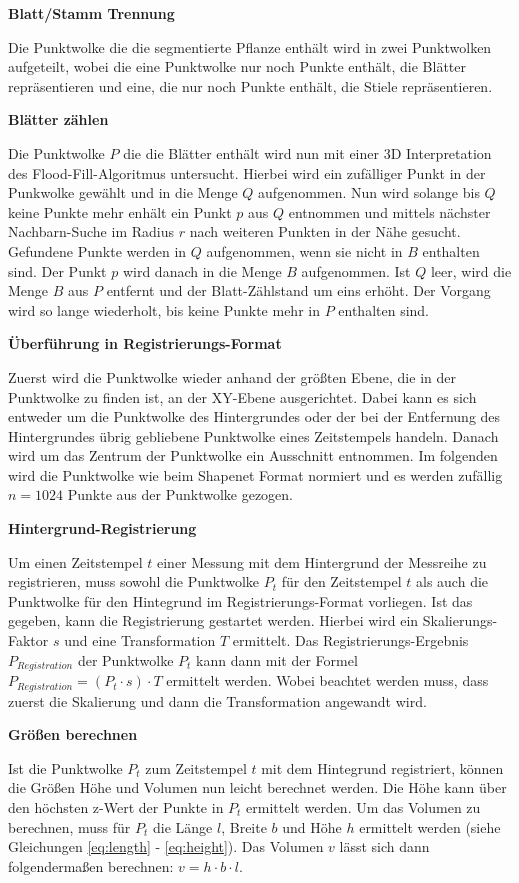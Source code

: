 \documentclass[12pt,titlepage, twoside]{article}
\begin{document}
\textbf{Blatt/Stamm Trennung}

Die Punktwolke die die segmentierte Pflanze enthält wird in zwei Punktwolken aufgeteilt, 
wobei die eine Punktwolke nur noch Punkte enthält, die Blätter repräsentieren und eine, die nur noch Punkte enthält, die Stiele repräsentieren.

\textbf{Blätter zählen}

Die Punktwolke $P$ die die Blätter enthält wird nun mit einer 3D Interpretation des Flood-Fill-Algoritmus untersucht. Hierbei wird ein zufälliger Punkt in der Punkwolke gewählt und in die Menge $Q$ aufgenommen.
Nun wird solange bis $Q$ keine Punkte mehr enhält ein Punkt $p$ aus $Q$ entnommen und mittels nächster Nachbarn-Suche im Radius $r$ nach weiteren Punkten in der Nähe gesucht. Gefundene Punkte werden in $Q$ aufgenommen, wenn sie nicht in $B$ enthalten sind.
Der Punkt $p$ wird danach in die Menge $B$ aufgenommen. Ist $Q$ leer, wird die Menge $B$ aus $P$ entfernt und der Blatt-Zählstand um eins erhöht. 
Der Vorgang wird so lange wiederholt, bis keine Punkte mehr in $P$ enthalten sind.

\textbf{Überführung in Registrierungs-Format }

Zuerst wird die Punktwolke wieder anhand der größten Ebene, die in der Punktwolke zu finden ist, an der XY-Ebene ausgerichtet.
Dabei kann es sich entweder um die Punktwolke des Hintergrundes oder der bei der Entfernung des Hintergrundes übrig gebliebene Punktwolke eines Zeitstempels handeln.
Danach wird um das Zentrum der Punktwolke ein Ausschnitt entnommen. 
Im folgenden wird die Punktwolke wie beim Shapenet Format normiert und es werden zufällig $n=1024$ Punkte aus der Punktwolke gezogen.

\textbf{Hintergrund-Registrierung}

Um einen Zeitstempel $t$ einer Messung mit dem Hintergrund der Messreihe zu registrieren, muss sowohl die Punktwolke $P_t$ für den Zeitstempel $t$ als auch die Punktwolke für den Hintegrund im Registrierungs-Format vorliegen.
Ist das gegeben, kann die Registrierung gestartet werden. Hierbei wird ein Skalierungs-Faktor $s$ und eine Transformation $T$ ermittelt. 
Das Registrierungs-Ergebnis $P_{Registration}$ der Punktwolke $P_t$ kann dann mit der Formel $P_{Registration} = (P_t \cdot s) \cdot T$ ermittelt werden. 
Wobei beachtet werden muss, dass zuerst die Skalierung und dann die Transformation angewandt wird.

\textbf{Größen berechnen}

Ist die Punktwolke $P_t$ zum Zeitstempel $t$ mit dem Hintegrund registriert, können die Größen Höhe und Volumen nun leicht berechnet werden.
Die Höhe kann über den höchsten z-Wert der Punkte in $P_t$ ermittelt werden. Um das Volumen zu berechnen, muss für $P_t$ die Länge $l$, Breite $b$ und Höhe $h$ ermittelt werden (siehe Gleichungen \ref{eq:length} - \ref{eq:height}). 
Das Volumen $v$ lässt sich dann folgendermaßen berechnen: $v = h \cdot b \cdot l$.
\end{document}
